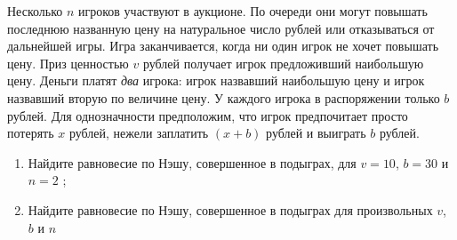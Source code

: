\begin{problem}[<<Лохотрон-2>>]
\begin{source} \cite{shubik:doll} \end{source}
Несколько  $n$  игроков участвуют в аукционе. По очереди они могут повышать последнюю названную цену на натуральное число рублей или отказываться от дальнейшей игры. Игра заканчивается, когда ни один игрок не хочет повышать цену. Приз ценностью  $v$  рублей получает игрок предложивший наибольшую цену. Деньги платят {\it два} игрока: игрок назвавший наибольшую цену и игрок назвавший вторую по величине цену. У каждого игрока в распоряжении только  $b$  рублей. Для однозначности предположим, что игрок предпочитает просто потерять  $x$  рублей, нежели заплатить  $\left(x+b\right)$  рублей и выиграть  $b$  рублей.\par
\begin{enumerate}
\item  Найдите равновесие по Нэшу, совершенное в подыграх, для  $v=10$,  $b=30$  и  $n=2$ ;\par
\item Найдите равновесие по Нэшу, совершенное в подыграх для произвольных  $v$,  $b$  и  $n$\par
\end{enumerate}


\begin{sol}
\end{sol}
\end{problem}



